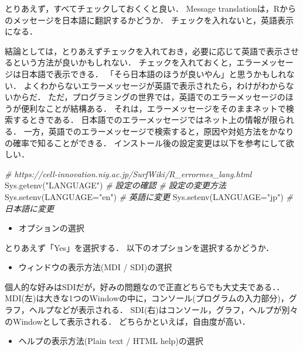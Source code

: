\documentclass[
]{article}
\newenvironment{Shaded}{\begin{snugshade}}{\end{snugshade}}
\newcommand{\AttributeTok}[1]{\textcolor[rgb]{0.77,0.63,0.00}{#1}}
\newcommand{\CommentTok}[1]{\textcolor[rgb]{0.56,0.35,0.01}{\textit{#1}}}
\newcommand{\FunctionTok}[1]{\textcolor[rgb]{0.00,0.00,0.00}{#1}}
\newcommand{\NormalTok}[1]{#1}
\newcommand{\StringTok}[1]{\textcolor[rgb]{0.31,0.60,0.02}{#1}}
\providecommand{\tightlist}{%
  \setlength{\itemsep}{0pt}\setlength{\parskip}{0pt}}
\begin{document}
とりあえず，すべてチェックしておくくと良い．
Message translationは，Rからのメッセージを日本語に翻訳するかどうか．
チェックを入れないと，英語表示になる．

結論としては，とりあえずチェックを入れておき，必要に応じて英語で表示させるという方法が良いかもしれない．
チェックを入れておくと，エラーメッセージは日本語で表示できる．
「そら日本語のほうが良いやん」と思うかもしれない．
よくわからないエラーメッセージが英語で表示されたら，わけがわからないからだ．
ただ，プログラミングの世界では，英語でのエラーメッセージのほうが便利なことが結構ある．
それは，エラーメッセージをそのままネットで検索するときである．
日本語でのエラーメッセージではネット上の情報が限られる．
一方，英語でのエラーメッセージで検索すると，原因や対処方法をかなりの確率で知ることができる．
インストール後の設定変更は以下を参考にして欲しい．

\begin{Shaded}
\begin{Highlighting}[]
  \CommentTok{\# https://cell{-}innovation.nig.ac.jp/SurfWiki/R\_errormes\_lang.html}
  \FunctionTok{Sys.getenv}\NormalTok{(}\StringTok{"LANGUAGE"}\NormalTok{) }\CommentTok{\# 設定の確認}
  \CommentTok{\# 設定の変更方法}
  \FunctionTok{Sys.setenv}\NormalTok{(}\AttributeTok{LANGUAGE=}\StringTok{"en"}\NormalTok{) }\CommentTok{\# 英語に変更}
  \FunctionTok{Sys.setenv}\NormalTok{(}\AttributeTok{LANGUAGE=}\StringTok{"jp"}\NormalTok{) }\CommentTok{\# 日本語に変更}
\end{Highlighting}
\end{Shaded}

\begin{itemize}
\tightlist
\item
  オプションの選択
\end{itemize}

とりあえず「Yes」を選択する．
以下のオプションを選択するかどうか．

\begin{itemize}
\tightlist
\item
  ウィンドウの表示方法(MDI / SDI)の選択
\end{itemize}

個人的な好みはSDIだが，好みの問題なので正直どちらでも大丈夫である．．
MDI(左)は大きな1つのWindowの中に，コンソール(プログラムの入力部分)，グラフ，ヘルプなどが表示される．
SDI(右)はコンソール，グラフ，ヘルプが別々のWindowとして表示される．
どちらかといえば，自由度が高い．

\begin{itemize}
\tightlist
\item
  ヘルプの表示方法(Plain text / HTML help)の選択
\end{itemize}
\end{document}
